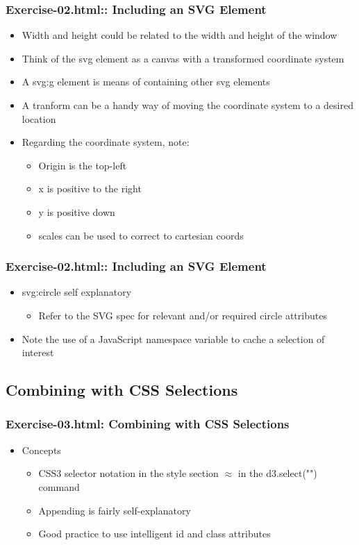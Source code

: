 \documentclass{beamer}
\begin{document}
\begin{frame}
    \frametitle{Exercise-02.html:: Including an SVG Element}
    \begin{itemize}
    \item Width and height could be related to the width and height of the window
    \item Think of the svg element as a canvas with a transformed coordinate system
    \item A svg:g element is means of containing other svg elements
    \item A tranform can be a handy way of moving the coordinate system to a desired location
    \item Regarding the coordinate system, note:
        \begin{itemize}
        \item Origin is the top-left
        \item x is positive to the right
        \item y is positive down
        \item scales can be used to correct to cartesian coords
        \end{itemize}
    \end{itemize}
\end{frame}


\begin{frame}
    \frametitle{Exercise-02.html:: Including an SVG Element}
    \begin{itemize}
    \item svg:circle self explanatory
        \begin{itemize}
        \item Refer to the SVG spec for relevant and/or required circle attributes
        \end{itemize}
    \item Note the use of a JavaScript namespace variable to cache a selection of interest
    \end{itemize}
\end{frame}



\subsection{Combining with CSS Selections}

\begin{frame}
    \frametitle{Exercise-03.html: Combining with CSS Selections}
    \begin{itemize}
    \item Concepts
        \begin{itemize}
        \item CSS3 selector notation in the style section $\approx$ in the d3.select("") command
        \item Appending is fairly self-explanatory
        \item Good practice to use intelligent id and class attributes
        \end{itemize}
    \end{itemize}
\end{frame}
\end{document}
